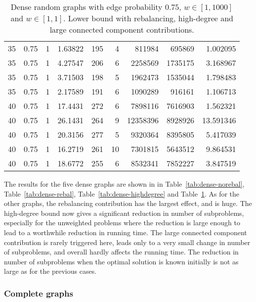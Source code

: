\documentclass[a4paper,11pt]{article}
\begin{document}
\begin{table}
\begin{center}
\begin{tabular}{|rrr|r|r|rrr|r|}
35 & 0.75 & 1 & 1.63822 & 195 & 4 & 811984 & 695869 & 1.002095 \\
35 & 0.75 & 1 & 4.27547 & 206 & 6 & 2258569 & 1735175 & 3.168967 \\
35 & 0.75 & 1 & 3.71503 & 198 & 5 & 1962473 & 1535044 & 1.798483 \\
35 & 0.75 & 1 & 2.17589 & 191 & 6 & 1090289 & 916161 & 1.106713 \\
40 & 0.75 & 1 & 17.4431 & 272 & 6 & 7898116 & 7616903 & 1.562321 \\
40 & 0.75 & 1 & 26.1431 & 264 & 9 & 12358396 & 8928926 & 13.591346 \\
40 & 0.75 & 1 & 20.3156 & 277 & 5 & 9320364 & 8395805 & 5.417039 \\
40 & 0.75 & 1 & 16.2719 & 261 & 10 & 7301815 & 5643512 & 9.864531 \\
40 & 0.75 & 1 & 18.6772 & 255 & 6 & 8532341 & 7852227 & 3.847519 \\
\hline
\end{tabular}
\end{center}
\caption{Dense random graphs with edge probability $0.75$,
  $w\in[1,1000]$ and $w\in[1,1]$. Lower bound with rebalancing,
  high-degree and large connected component contributions.}
\label{tab:dense-all}
\end{table}

The results for the five dense graphs are shown in in
Table~\ref{tab:dense-norebal}, Table~\ref{tab:dense-rebal},
Table~\ref{tab:dense-highdegree} and Table~\ref{tab:dense-all}.  As
for the other graphs, the rebalancing contribution has the largest
effect, and is huge. The high-degree bound now gives a significant
reduction in number of subproblems, especially for the unweighted
problems where the reduction is large enough to lead to a worthwhile
reduction in running time. The large connected component contribution
is rarely triggered here, leads only to a very small change
in number of subproblems, and overall hardly affects the running time.
The reduction in number of subproblems when the optimal solution is
known initially is not as large as for the previous cases.

\subsubsection{Complete  graphs}
\end{document}
